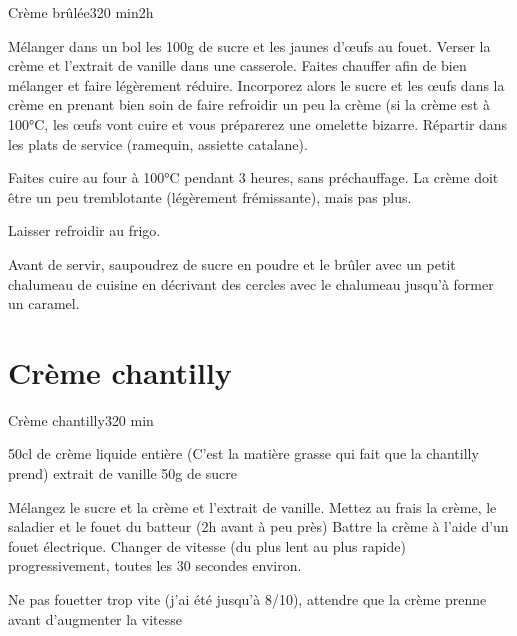 {\begin{recette}{Crème brûlée}{3}{20 min}{2h}
\begin{preparation}
\etape Mélanger dans un bol les 100g de sucre et les jaunes d'œufs au fouet.
\etape Verser la crème et l'extrait de vanille dans une casserole. Faites chauffer afin de bien mélanger et faire légèrement 
réduire. 
\etape Incorporez alors le sucre et les œufs dans la crème en prenant bien soin de faire refroidir un peu la crème (si la crème 
est à 100°C, les œufs vont cuire et vous préparerez une omelette bizarre.
\etape Répartir dans les plats de service (ramequin, assiette catalane).
\end{preparation}

\begin{cuisson}
Faites cuire au four à 100°C pendant 3 heures, sans préchauffage. La crème doit être un peu tremblotante 
(légèrement frémissante), mais pas plus. 

Laisser refroidir au frigo. 

Avant de servir, saupoudrez de sucre en poudre et le brûler avec un petit chalumeau de cuisine en décrivant des cercles avec le 
chalumeau jusqu'à former un caramel. 

\end{cuisson}
\end{recette}

\section{Crème chantilly}
\begin{recette}{Crème chantilly}{3}{20 min}{}
\begin{ingredients}[4 pers.]
\ingredient 50cl de crème liquide entière (C'est la matière grasse qui fait que la chantilly prend)
\ingredient extrait de vanille
\ingredient 50g de sucre
\end{ingredients}

\begin{preparation}
\etape Mélangez le sucre et la crème et l'extrait de vanille.
\etape Mettez au frais la crème, le saladier et le fouet du batteur (2h avant à peu près)
\etape 
Battre la crème à l'aide d'un fouet électrique. Changer de vitesse (du plus lent au plus rapide) progressivement, toutes les 30 
secondes environ.
\begin{remarque}
Ne pas fouetter trop vite (j'ai été jusqu'à 8/10), attendre que la crème prenne avant d'augmenter la vitesse
\end{remarque}
\end{preparation}
\end{recette}

}
